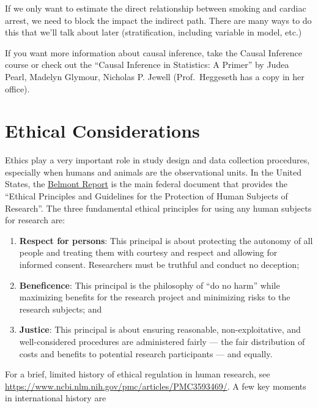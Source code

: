 \documentclass[]{book}
\begin{document}
If we only want to estimate the direct relationship between smoking and cardiac arrest, we need to block the impact the indirect path. There are many ways to do this that we'll talk about later (stratification, including variable in model, etc.)

If you want more information about causal inference, take the Causal Inference course or check out the ``Causal Inference in Statistics: A Primer'' by Judea Pearl, Madelyn Glymour, Nicholas P. Jewell (Prof.~Heggeseth has a copy in her office).

\hypertarget{ethical-considerations}{%
\section{Ethical Considerations}\label{ethical-considerations}}

Ethics play a very important role in study design and data collection procedures, especially when humans and animals are the observational units. In the United States, the \href{https://www.hhs.gov/ohrp/regulations-and-policy/belmont-report/index.html}{Belmont Report} is the main federal document that provides the ``Ethical Principles and Guidelines for the Protection of Human Subjects of Research''. The three fundamental ethical principles for using any human subjects for research are:

\begin{enumerate}
\def\labelenumi{\arabic{enumi}.}
\item
  \textbf{Respect for persons}: This principal is about protecting the autonomy of all people and treating them with courtesy and respect and allowing for informed consent. Researchers must be truthful and conduct no deception;
\item
  \textbf{Beneficence}: This principal is the philosophy of ``do no harm'' while maximizing benefits for the research project and minimizing risks to the research subjects; and
\item
  \textbf{Justice}: This principal is about ensuring reasonable, non-exploitative, and well-considered procedures are administered fairly --- the fair distribution of costs and benefits to potential research participants --- and equally.
\end{enumerate}

For a brief, limited history of ethical regulation in human research, see \url{https://www.ncbi.nlm.nih.gov/pmc/articles/PMC3593469/}. A few key moments in international history are
\end{document}
